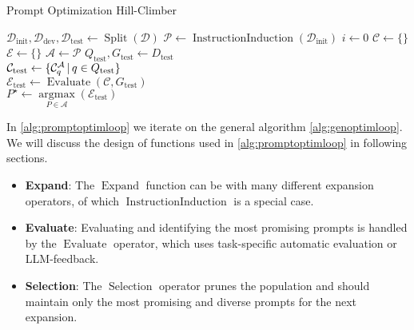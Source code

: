 \begin{algorithm}
    \caption{Prompt Optimization Hill-Climber}
    \label{alg:promptoptimloop}
    $\mathcal{D}_{\text{init}}, \mathcal{D}_{\text{dev}}, \mathcal{D}_{\text{test}} \gets \operatorname{Split}(\mathcal{D})$ 
    $\mathcal{P} \gets \operatorname{InstructionInduction}(\mathcal{D}_{\text{init}})$ 
    $i \gets 0$ 
    $\mathcal{C} \gets \{\}$  
    $\mathcal{E} \gets \{\}$ 
    $\mathcal{A} \gets \mathcal{P}$ 
    $Q_{\text{test}}, G_{\text{test}} \gets D_{\text{test}}$\\
    $\mathcal{C}_{\text{test}} \gets \{\mathcal{C}_{q}^{\mathcal{A}}\, \vert \, q \in Q_{\text{test}}\}$\\
    $\mathcal{E}_{\text{test}} \gets \operatorname{Evaluate}(\mathcal{C}, G_{\text{test}})$\\
    $P^{\star} \gets \underset{P\in\mathcal{A}}{\operatorname{argmax}}(\mathcal{E}_{\text{test}})$\\
\end{algorithm}
In \ref{alg:promptoptimloop} we iterate on the general algorithm \ref{alg:genoptimloop}. 
We will discuss the design of functions used in \ref{alg:promptoptimloop} in following sections.
\begin{itemize}
    \item \textbf{Expand}: The $\operatorname{Expand}$ function can be with many different expansion operators, of which $\operatorname{InstructionInduction}$
    is a special case. 
    \item \textbf{Evaluate}: Evaluating and identifying the most promising prompts is handled by the $\operatorname{Evaluate}$ operator, which uses task-specific automatic evaluation or LLM-feedback.
    \item \textbf{Selection}: The $\operatorname{Selection}$ operator prunes the population and should maintain only the most promising and diverse prompts for the next expansion.
\end{itemize}

